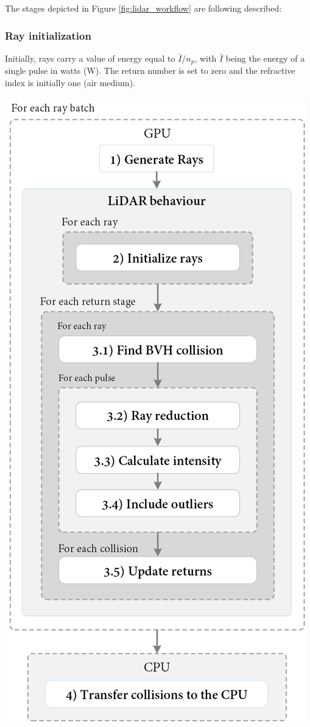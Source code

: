 The stages depicted in Figure \ref{fig:lidar_workflow} are following described:
\subsubsection{Ray initialization}

Initially, rays carry a value of energy equal to $\bar{I} / n_{p}$, with $\bar{I}$ being the energy of a single pulse in watts (\si{\watt}). The return number is set to zero and the refractive index is initially one (air medium). 

\begin{marginfigure}[-4.0cm]
	\centering
	\includegraphics[width=\linewidth]{figs/lidar_simulation/lidar_overview.png}

\end{marginfigure}
